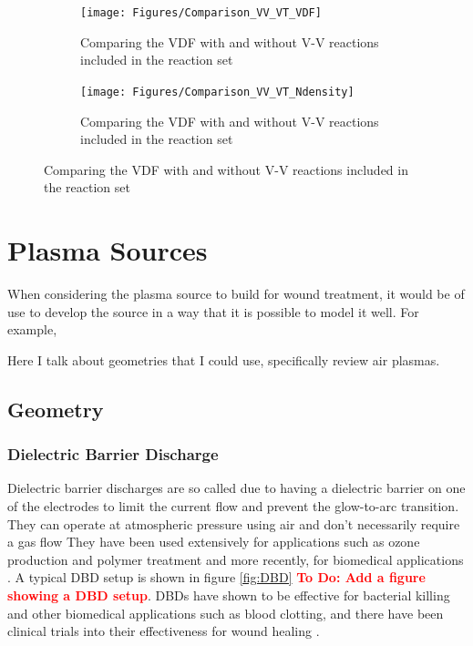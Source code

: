 \documentclass[11pt, oneside]{article}   	%
\newcommand{\todo}[1]{ \textcolor{red}{\bf{To Do:} #1}}
\begin{document}
\begin{figure}
\begin{subfigure}{0.5\textwidth}
\begin{center}
\texttt{[image: Figures/Comparison\_VV\_VT\_VDF]}
\caption{Comparing the VDF with and without V-V reactions included in the reaction set}
\label{fig:VDFComp}
\end{center}
\end{subfigure}
\begin{subfigure}{0.5\textwidth}
\begin{center}
\texttt{[image: Figures/Comparison\_VV\_VT\_Ndensity]}
\caption{Comparing the VDF with and without V-V reactions included in the reaction set}
\label{fig:NComp}
\end{center}
\end{subfigure}
\end{figure}


%


\section{Plasma Sources}


When considering the plasma source to build for wound treatment, it would be of use to develop the source in a way that it is possible to model it well.
For example, 


Here I talk about geometries that I could use, specifically review air plasmas.
\subsection{Geometry}
\subsubsection{Dielectric Barrier Discharge}
Dielectric barrier discharges are so called due to having a dielectric barrier on one of the electrodes to limit the current flow and prevent the glow-to-arc transition. 
They can operate at atmospheric pressure using air and don't necessarily require a gas flow \cite{Fridman2013plasmamedicine}
They have been used extensively for applications such as ozone production and polymer treatment and more recently, for biomedical applications \cite{Fridman2013plasmamedicine, Brehmer2015alleviation}.
A typical DBD setup is shown in figure \ref{fig:DBD} \todo{Add a figure showing a DBD setup}.
DBDs have shown to be effective for bacterial killing and other biomedical applications such as blood clotting, and there have been clinical trials into their effectiveness for wound healing \cite{Daeschlein2012in, Fridman2006blood, Brehmer2015alleviation}. 
\end{document}
